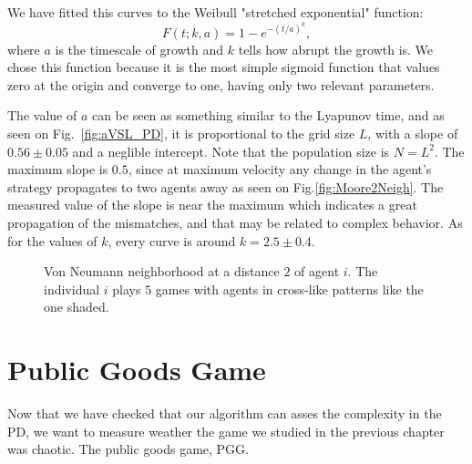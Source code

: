 We have fitted this curves to the Weibull "stretched exponential" function:
\begin{equation}
    F(t;k,a)=1-e^{-(t/a)^k},
    \label{WeibullDistr}
\end{equation}
where $a$ is the timescale of growth and $k$ tells how abrupt the growth is. We chose this function because it is the most simple sigmoid function that values zero at the origin and converge to one, having only two relevant parameters.

The value of $a$ can be seen as something similar to the Lyapunov time, and as seen on Fig.~\ref{fig:aVSL_PD}, it is proportional to the grid size $L$, with a slope of $0.56 \pm 0.05$ and a neglible intercept. Note that the population size is $N = L^2$. The maximum slope is $0.5$, since at maximum velocity any change in the agent's strategy propagates to two agents away as seen on Fig.\ref{fig:Moore2Neigh}. The measured value of the slope is near the maximum which indicates a great propagation of the mismatches, and that may be related to complex behavior. As for the values of $k$, every curve is around $k = 2.5\pm0.4$.




\begin{figure}
\centering
{}
\caption{Von Neumann neighborhood at a distance $2$ of agent $i$. The individual $i$ plays $5$ games with agents in cross-like patterns like the one shaded.}
\label{fig:VonNeumman2Neigh}
\end{figure}



\section{Public Goods Game}

Now that we have checked that our algorithm can asses the complexity in the PD, we want to measure weather the game we studied in the previous chapter was chaotic. The public goods game, PGG. 

